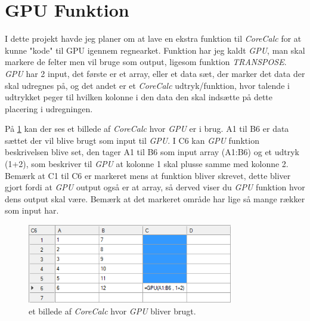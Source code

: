 \section{GPU Funktion}
I dette projekt havde jeg planer om at lave en ekstra funktion til \textit{CoreCalc} for at kunne "kode" til GPU igennem regnearket. Funktion har jeg kaldt \emph{GPU}, man skal markere de felter men vil bruge som output, ligesom funktion \textit{TRANSPOSE}. \emph{GPU} har 2 input, det første er et array, eller et data sæt, der marker det data der skal udregnes på, og det andet er et \textit{CoreCalc} udtryk/funktion, hvor talende i udtrykket peger til hvilken kolonne i den data den skal indsætte på dette placering i udregningen.

På \ref{fig:corecalc1} kan der ses et billede af \textit{CoreCalc} hvor \textit{GPU} er i brug. A1 til B6 er data sættet der vil blive brugt som input til \textit{GPU}. I C6 kan \textit{GPU} funktion beskrivelsen blive set, den tager A1 til B6 som input array (A1:B6) og et udtryk (1+2), som beskriver til \textit{GPU} at kolonne 1 skal plusse samme med kolonne 2. Bemærk at C1 til C6 er markeret mens at funktion bliver skrevet, dette bliver gjort fordi at \textit{GPU} output også er at array, så derved viser du \textit{GPU} funktion hvor dens output skal være. Bemærk at det markeret område har lige så mange rækker som input har.

\begin{figure}[p]
    \centering
    \includegraphics[width=0.8\textwidth]{Content/Graphic/corecalc1.png}
    \caption{et billede af \textit{CoreCalc} hvor \textit{GPU} bliver brugt.}
    \label{fig:corecalc1}
\end{figure}
